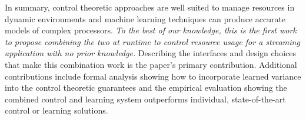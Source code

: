 In summary, control theoretic approaches are well suited to manage
resources in dynamic environments and machine learning techniques can
produce accurate models of complex processors.  \emph{To the best of
  our knowledge, this is the first work to propose combining the two
  at runtime to control resource usage for a streaming application
  with no prior knowledge.}  Describing the interfaces and design
choices that make this combination work is the paper's primary
contribution.  Additional contributions include formal analysis
showing how to incorporate learned variance into the control theoretic
guarantees and the empirical evaluation showing the combined control
and learning system outperforms individual, state-of-the-art control
or learning solutions.

